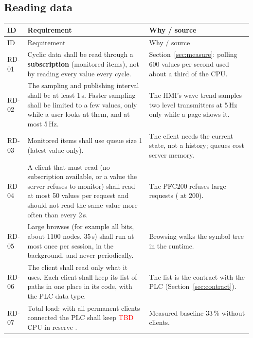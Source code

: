 \documentclass[11pt,a4paper]{article}
\makeatletter
\newenvironment{reqtable}{%
  \begin{small}
  \setlength{\tabcolsep}{4pt}%
  \begin{longtable}{@{}P{14mm}P{86mm}P{60mm}@{}}
  \toprule
  ID & Requirement & Why / source\\
  \midrule
  \endfirsthead
  \toprule
  ID & Requirement & Why / source\\
  \midrule
  \endhead
  \bottomrule
  \endfoot
}{%
  \end{longtable}
  \end{small}
}
\newcommand{\TBD}{\textcolor{red}{TBD}}
\makeatother
\begin{document}
\subsection{Reading data}
\begin{reqtable}
RD-01 & Cyclic data shall be read through a \textbf{subscription} (monitored items), not by reading every
value every cycle. & Section~\ref{sec:measure}: polling 600 values per second used about a third of the CPU.\\
RD-02 & The sampling and publishing interval shall be at least 1\,s. Faster sampling shall be limited to
a few values, only while a user looks at them, and at most 5\,Hz. & The HMI's wave trend samples two
level transmitters at 5\,Hz only while a page shows it.\\
RD-03 & Monitored items shall use queue size 1 (latest value only). & The client needs the current state,
not a history; queues cost server memory.\\
RD-04 & A client that must read (no subscription available, or a value the server refuses to monitor)
shall read at most 50 values per request and should not read the same value more often than every 2\,s.
& The PFC200 refuses large requests ( at 200).\\
RD-05 & Large browses (for example all  bits, about 1100 nodes, 35\,s) shall run at most
once per session, in the background, and never periodically. & Browsing walks the symbol tree in the
runtime.\\
RD-06 & The client shall read only what it uses. Each client shall keep its list of paths in one place
in its code, with the PLC data type. & The list is the contract with the PLC (Section~\ref{sec:contract}).\\
RD-07 & Total load: with all permanent clients connected the PLC shall keep \TBD{} CPU in reserve
. & Measured baseline 33\,\% without clients.\\
\end{reqtable}
\end{document}
